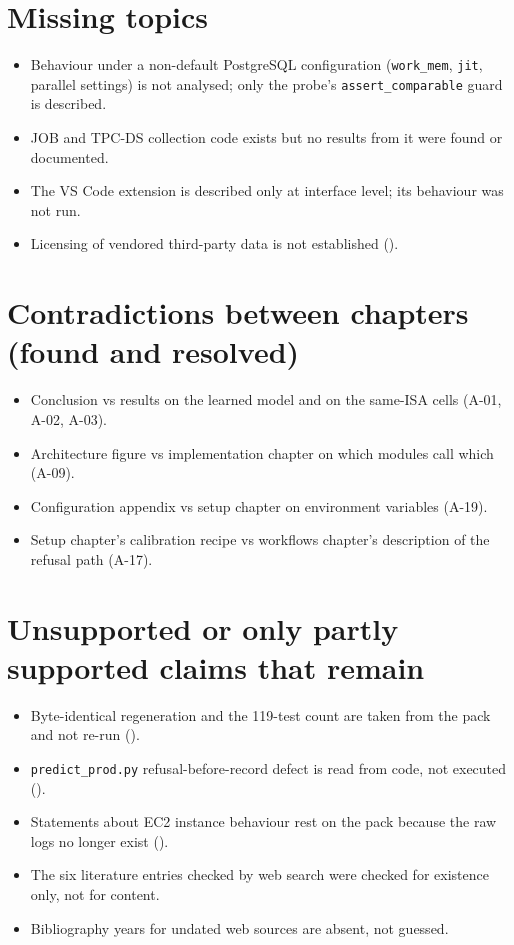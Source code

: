 \section{Missing topics}
\begin{itemize}
\item Behaviour under a non-default PostgreSQL configuration (\texttt{work\_mem}, \texttt{jit}, parallel settings) is not analysed; only the probe's \texttt{assert\_comparable} guard is described.
\item JOB and TPC-DS collection code exists but no results from it were found or documented.
\item The VS Code extension is described only at interface level; its behaviour was not run.
\item Licensing of vendored third-party data is not established (\evUNK).
\end{itemize}

\section{Contradictions between chapters (found and resolved)}
\begin{itemize}
\item Conclusion vs results on the learned model and on the same-ISA cells (A-01, A-02, A-03).
\item Architecture figure vs implementation chapter on which modules call which (A-09).
\item Configuration appendix vs setup chapter on environment variables (A-19).
\item Setup chapter's calibration recipe vs workflows chapter's description of the refusal path (A-17).
\end{itemize}

\section{Unsupported or only partly supported claims that remain}
\begin{itemize}
\item Byte-identical regeneration and the 119-test count are taken from the pack and not re-run (\evPACK).
\item \texttt{predict\_prod.py} refusal-before-record defect is read from code, not executed (\evCODE).
\item Statements about EC2 instance behaviour rest on the pack because the raw logs no longer exist (\evPACK).
\item The six literature entries checked by web search were checked for existence only, not for content.
\item Bibliography years for undated web sources are absent, not guessed.
\end{itemize}

